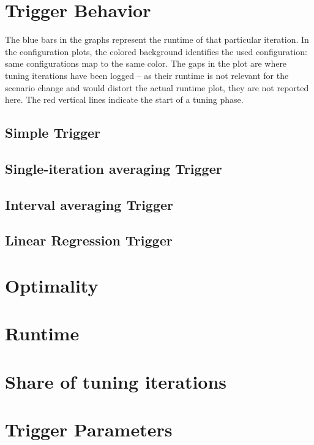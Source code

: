 \section{Trigger Behavior}
The blue bars in the graphs represent the runtime of that particular iteration.
In the configuration plots, the colored background identifies the used configuration: same configurations map to the same color. The gaps in the plot are where tuning iterations have been logged -- as their runtime is not relevant for the scenario change and would distort the actual runtime plot, they are not reported here. The red vertical lines indicate the start of a tuning phase.

\subsection{Simple Trigger}
\subsection{Single-iteration averaging Trigger}
\subsection{Interval averaging Trigger}
\subsection{Linear Regression Trigger}


\section{Optimality}
\section{Runtime}
\section{Share of tuning iterations}
\section{Trigger Parameters}

